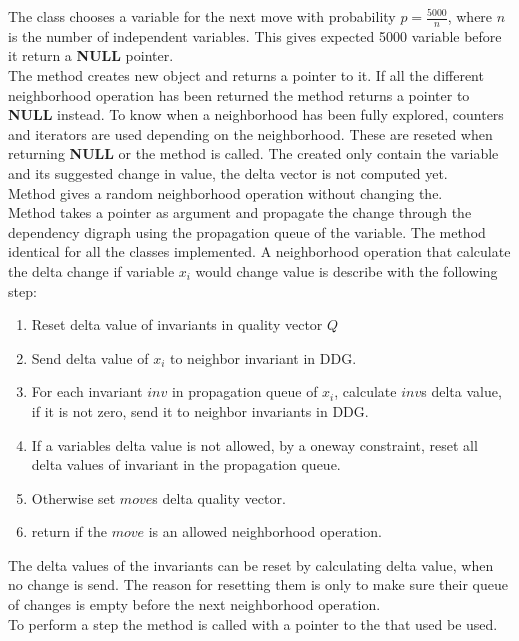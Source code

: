 The  class chooses a variable for the next move with probability $p = \frac{5000}{n}$, where 
$n$ is the number of independent variables. This gives expected 5000 variable before it return a \textbf{NULL} pointer. 
\\
The method  creates new  object and returns a pointer to it. If all the 
different neighborhood operation has been returned the method returns a pointer to \textbf{NULL} instead. To know when 
a neighborhood has been fully explored, counters and iterators are used depending on the neighborhood. These are 
reseted when returning \textbf{NULL} or the method  is called. The  created only 
contain the variable and its suggested change in value, the delta vector is not computed yet. \\ 
Method  gives a random neighborhood operation without changing the.  \\ 
Method  takes a  pointer as argument and propagate the change through the 
dependency digraph using the propagation queue of the variable. The method identical for all the  
classes implemented. A neighborhood operation that calculate the delta change if variable $x_i$ would change value is 
describe with the following step:
\begin{enumerate} 
 \item Reset delta value of invariants in quality vector $Q$
 \item Send delta value of $x_i$ to neighbor invariant in DDG.
 \item For each invariant $inv$ in propagation queue of $x_i$, calculate $inv$s delta value, if it is not zero, send 
it to neighbor invariants in DDG. 
 \item If a variables delta value is not allowed, by a oneway constraint, reset all delta values of invariant in 
the propagation queue.
 \item Otherwise set $move$s delta quality vector. 
\item return if the $move$ is an allowed neighborhood operation. 
\end{enumerate}
The delta values of the invariants can be reset by calculating delta value, when no change is send. The reason for 
resetting them is only to make sure their queue of changes is empty before the next neighborhood operation. \\ 
To perform a step the method  is called with a pointer to the  that used be used.  

